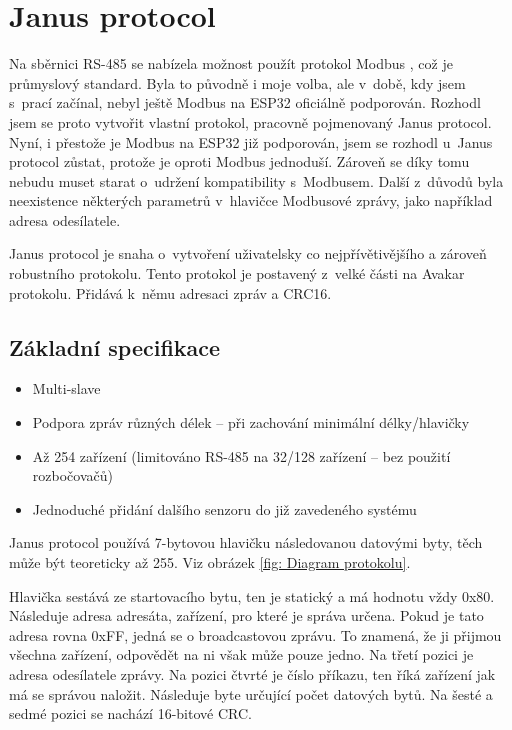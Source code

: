 \chapter{Janus protocol}
Na sběrnici RS-485 se nabízela možnost použít protokol Modbus \cite{modbus}, což je průmyslový standard.
Byla to původně i moje volba, ale v~době, kdy jsem s~prací začínal, nebyl ještě Modbus na ESP32 oficiálně podporován.
Rozhodl jsem se proto vytvořit vlastní protokol, pracovně pojmenovaný Janus protocol.
Nyní, i přestože je Modbus na ESP32 již podporován, jsem se rozhodl u~Janus protocol zůstat, protože je oproti Modbus jednoduší.
Zároveň se díky tomu nebudu muset starat o~udržení kompatibility s~Modbusem.
Další z~důvodů byla neexistence některých parametrů v~hlavičce Modbusové zprávy, jako například adresa odesílatele. 

Janus protocol je snaha o~vytvoření uživatelsky co nejpřívětivějšího a zároveň robustního protokolu.
Tento protokol je postavený z~velké části na Avakar protokolu.
Přidává k~němu adresaci zpráv a CRC16.


\section{Základní specifikace}
\begin{itemize}
    \item Multi-slave
    \item Podpora zpráv různých délek -- při zachování minimální délky/hlavičky
    \item Až 254 zařízení (limitováno RS-485 na 32/128 zařízení -- bez použití rozbočovačů)
    \item Jednoduché přidání dalšího senzoru do již zavedeného systému
\end{itemize}

Janus protocol používá 7-bytovou hlavičku následovanou datovými byty, těch může být teoreticky až 255.
Viz obrázek \ref{fig: Diagram protokolu}.

Hlavička sestává ze startovacího bytu, ten je statický a má hodnotu vždy 0x80.
Následuje adresa adresáta, zařízení, pro které je správa určena.
Pokud je tato adresa rovna 0xFF, jedná se o broadcastovou zprávu. To znamená, že ji přijmou všechna zařízení, odpovědět na ni však může pouze jedno.
Na třetí pozici je adresa odesílatele zprávy.
Na pozici čtvrté je číslo příkazu, ten říká zařízení jak má se správou naložit.
Následuje byte určující počet datových bytů.
Na šesté a sedmé pozici se nachází 16-bitové CRC.

